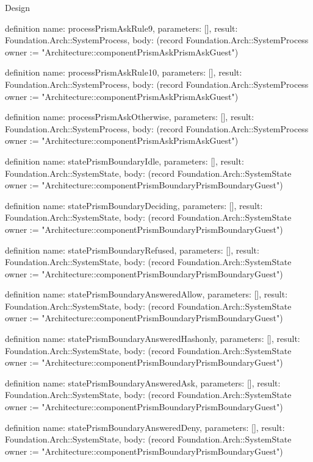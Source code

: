 \begin{lexlean}{Design}
\begin{semanticmodule}
definition{
  name: processPrismAskRule9,
  parameters: [],
  result: Foundation.Arch::SystemProcess,
  body: (record Foundation.Arch::SystemProcess {owner := "Architecture::componentPrismAskPrismAskGuest"})
}

definition{
  name: processPrismAskRule10,
  parameters: [],
  result: Foundation.Arch::SystemProcess,
  body: (record Foundation.Arch::SystemProcess {owner := "Architecture::componentPrismAskPrismAskGuest"})
}

definition{
  name: processPrismAskOtherwise,
  parameters: [],
  result: Foundation.Arch::SystemProcess,
  body: (record Foundation.Arch::SystemProcess {owner := "Architecture::componentPrismAskPrismAskGuest"})
}

definition{
  name: statePrismBoundaryIdle,
  parameters: [],
  result: Foundation.Arch::SystemState,
  body: (record Foundation.Arch::SystemState {owner := "Architecture::componentPrismBoundaryPrismBoundaryGuest"})
}

definition{
  name: statePrismBoundaryDeciding,
  parameters: [],
  result: Foundation.Arch::SystemState,
  body: (record Foundation.Arch::SystemState {owner := "Architecture::componentPrismBoundaryPrismBoundaryGuest"})
}

definition{
  name: statePrismBoundaryRefused,
  parameters: [],
  result: Foundation.Arch::SystemState,
  body: (record Foundation.Arch::SystemState {owner := "Architecture::componentPrismBoundaryPrismBoundaryGuest"})
}

definition{
  name: statePrismBoundaryAnsweredAllow,
  parameters: [],
  result: Foundation.Arch::SystemState,
  body: (record Foundation.Arch::SystemState {owner := "Architecture::componentPrismBoundaryPrismBoundaryGuest"})
}

definition{
  name: statePrismBoundaryAnsweredHashonly,
  parameters: [],
  result: Foundation.Arch::SystemState,
  body: (record Foundation.Arch::SystemState {owner := "Architecture::componentPrismBoundaryPrismBoundaryGuest"})
}

definition{
  name: statePrismBoundaryAnsweredAsk,
  parameters: [],
  result: Foundation.Arch::SystemState,
  body: (record Foundation.Arch::SystemState {owner := "Architecture::componentPrismBoundaryPrismBoundaryGuest"})
}

definition{
  name: statePrismBoundaryAnsweredDeny,
  parameters: [],
  result: Foundation.Arch::SystemState,
  body: (record Foundation.Arch::SystemState {owner := "Architecture::componentPrismBoundaryPrismBoundaryGuest"})
}


\end{semanticmodule}
\end{lexlean}
